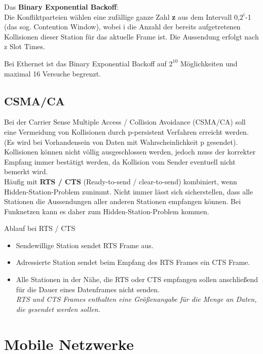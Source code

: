 \documentclass{article} %
\begin{document}
\noindent Das \textbf{Binary Exponential Backoff}: \\
Die Konfliktparteien wählen eine zufällige ganze Zahl \textbf{z}
 aus dem Intervall 0,$2^i$-1 (das sog. Contention Window), 
wobei i die Anzahl der bereits aufgetretenen Kollisionen dieser Station für das aktuelle Frame ist. Die Aussendung erfolgt nach z Slot Times. 

Bei Ethernet ist das Binary Exponential Backoff auf $2^{10}$  Möglichkeiten und 
maximal 16 Versuche begrenzt.  	

\subsection{CSMA/CA}
Bei der Carrier Sense Multiple Access / Collision Avoidance (CSMA/CA) soll eine Vermeidung von Kollisionen durch p-persistent Verfahren erreicht werden. (Es wird bei Vorhandensein von Daten mit Wahrscheinlichkeit p gesendet). Kollisionen können nicht völlig ausgeschlossen werden, jedoch muss der korrekter Empfang immer bestätigt werden, da Kollision vom Sender eventuell nicht bemerkt wird. \\

\noindent Häufig mit \textbf{RTS / CTS} (Ready-to-send / clear-to-send) kombiniert, wenn Hidden-Station-Problem zunimmt. Nicht immer lässt sich sicherstellen, dass alle Stationen die Aussendungen aller anderen Stationen empfangen können. Bei Funknetzen kann es daher zum Hidden-Station-Problem kommen. 

\noindent Ablauf bei RTS / CTS
	\begin{itemize}
	\item Sendewillige Station sendet RTS Frame aus. 
	\item Adressierte Station sendet beim Empfang des RTS Frames ein CTS Frame. 
	\item Alle Stationen in der Nähe, die RTS oder CTS empfangen sollen anschließend für die Dauer eines Datenframes nicht senden. \\
	\textit{RTS und CTS Frames enthalten eine Größenangabe für die Menge an Daten, die gesendet werden sollen. }
	
	\end{itemize}



\section{Mobile Netzwerke}
\end{document}

